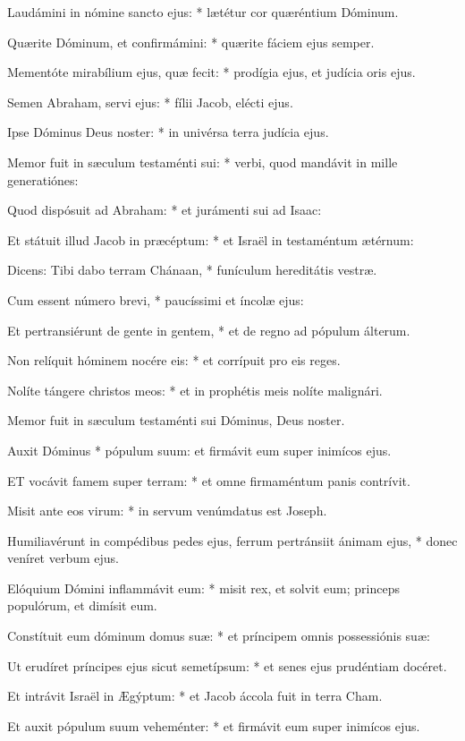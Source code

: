 Laudámini in nómine sancto ejus: * lætétur cor quæréntium Dóminum.

Quærite Dóminum, et confirmámini: * quærite fáciem ejus semper.

Mementóte mirabílium ejus, quæ fecit: * prodígia ejus, et judícia oris ejus.

Semen Abraham, servi ejus: * fílii Jacob, elécti ejus.

Ipse Dóminus Deus noster: * in univérsa terra judícia ejus.

Memor fuit in sæculum testaménti sui: * verbi, quod mandávit in mille generatiónes:

Quod dispósuit ad Abraham: * et jurámenti sui ad Isaac:

Et státuit illud Jacob in præcéptum: * et Israël in testaméntum ætérnum:

Dicens: Tibi dabo terram Chánaan, * funículum hereditátis vestræ.

Cum essent número brevi, * paucíssimi et íncolæ ejus:

Et pertransiérunt de gente in gentem, * et de regno ad pópulum álterum.

Non relíquit hóminem nocére eis: * et corrípuit pro eis reges.

Nolíte tángere christos meos: * et in prophétis meis nolíte malignári.

 Memor fuit in sæculum testaménti sui Dóminus, Deus noster.

 Auxit Dóminus * pópulum suum: et firmávit eum super inimícos ejus.


\lettrine[lines=2]{E}{T} vocávit famem super terram: * et omne firmaméntum panis contrívit.

Misit ante eos virum: * in servum venúmdatus est Joseph.

Humiliavérunt in compédibus pedes ejus, ferrum pertránsiit ánimam ejus, * donec veníret verbum ejus.

Elóquium Dómini inflammávit eum: * misit rex, et solvit eum; princeps populórum, et dimísit eum.

Constítuit eum dóminum domus suæ: * et príncipem omnis possessiónis suæ:

Ut erudíret príncipes ejus sicut semetípsum: * et senes ejus prudéntiam docéret.

Et intrávit Israël in Ægýptum: * et Jacob áccola fuit in terra Cham.

Et auxit pópulum suum veheménter: * et firmávit eum super inimícos ejus.

